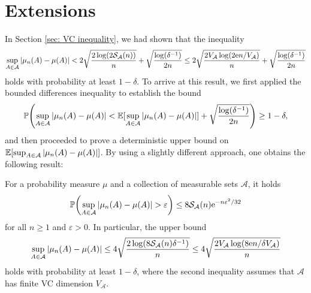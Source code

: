 \section{Extensions}

In Section \ref{sec: VC inequality}, we had shown that the inequality
\[
    \sup_{A \in \mathcal{A}} \abs{\mu_n(A) - \mu(A)} < 2 \sqrt{\frac{2 \log(2 \mathcal{S}_{\mathcal{A}}(n))}{n}} + \sqrt{\frac{\log(\delta^{-1})}{2n}} \leq 2 \sqrt{\frac{2 V_{\mathcal{A}} \log(2 \mathrm{e} n / V_{\mathcal{A}})}{n}} + \sqrt{\frac{\log(\delta^{-1})}{2n}}
\]
holds with probability at least $1 - \delta$. To arrive at this result, we first applied the bounded differences inequality to establish the bound
\[
    \P\left(\sup_{A \in \mathcal{A}} \abs{\mu_n(A) - \mu(A)} < \Exp[\sup_{A \in \mathcal{A}} \abs{\mu_n(A) - \mu(A)}] + \sqrt{\frac{\log(\delta^{-1})}{2n}}\right) \geq 1 - \delta,
\]
and then proceeded to prove a deterministic upper bound on $\operatorname{\mathbb{E}}[\sup_{A \in \mathcal{A}} \abs{\mu_n(A) - \mu(A)}]$. By using a slightly different approach, one obtains the following result:

\begin{theorem}
\label{thm: VC inequality (2nd version)}
For a probability measure $\mu$ and a collection of measurable sets $\mathcal{A}$, it holds
\[
    \P\left(\sup_{A \in \mathcal{A}} \abs{\mu_n(A) - \mu(A)} > \varepsilon\right) \leq 8 \mathcal{S}_{\mathcal{A}}(n) \e^{-n \varepsilon^2 / 32}
\]
for all $n \geq 1$ and $\varepsilon > 0$. In particular, the upper bound
\[
    \sup_{A \in \mathcal{A}} \abs{\mu_n(A) - \mu(A)} \leq 4 \sqrt{\frac{2 \log(8 \mathcal{S}_{\mathcal{A}}(n) \delta^{-1})}{n}} \leq 4 \sqrt{\frac{2 V_{\mathcal{A}} \log(8 \mathrm{e} n / \delta V_{\mathcal{A}})}{n}}
\]
holds with probability at least $1 - \delta$, where the second inequality assumes that $\mathcal{A}$ has finite VC dimension $V_{\mathcal{A}}$.
\end{theorem}

